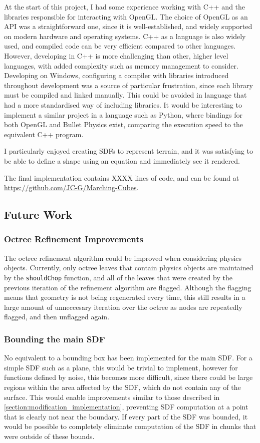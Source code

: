 \documentclass[11pt]{article}
\begin{document}
At the start of this project, I had some experience working with C++ and the libraries responsible for interacting with OpenGL. The choice of OpenGL as an API was a straightforward one, since it is well-established, and widely supported on modern hardware and operating systems. C++ as a language is also widely used, and compiled code can be very efficient compared to other languages. However, developing in C++ is more challenging than other, higher level languages, with added complexity such as memory management to consider. Developing on Windows, configuring a compiler with libraries introduced throughout development was a source of particular frustration, since each library must be compiled and linked manually. This could be avoided in language that had a more standardised way of including libraries. It would be interesting to implement a similar project in a language such as Python, where bindings for both OpenGL and Bullet Physics exist, comparing the execution speed to the equivalent C++ program.

I particularly enjoyed creating SDFs to represent terrain, and it was satisfying to be able to define a shape using an equation and immediately see it rendered. 

The final implementation contains XXXX lines of code, and can be found at \url{https://github.com/JC-G/Marching-Cubes}.

\subsection{Future Work}
\label{section:future_work}
\subsubsection{Octree Refinement Improvements}
The octree refinement algorithm could be improved when considering physics objects. Currently, only octree leaves that contain physics objects are maintained by the \texttt{shouldChop} function, and all of the leaves that were created by the previous iteration of the refinement algorithm are flagged. Although the flagging means that geometry is not being regenerated every time, this still results in a large amount of unneccesary iteration over the octree as nodes are repeatedly flagged, and then unflagged again.
\subsubsection{Bounding the main SDF}
No equivalent to a bounding box has been implemented for the main SDF. For a simple SDF such as a plane, this would be trivial to implement, however for functions defined by noise, this becomes more difficult, since there could be large regions within the area affected by the SDF, which do not contain any of the surface. This would enable improvements similar to those described in \ref{section:modification_implementation}, preventing SDF computation at a point that is clearly not near the boundary. If every part of the SDF was bounded, it would be possible to completely eliminate computation of the SDF in chunks that were outside of these bounds. 
\end{document}
